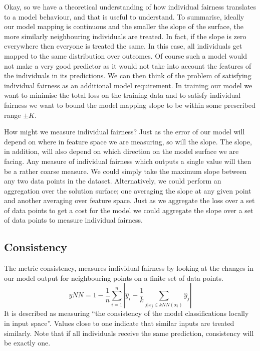 Okay, so we have a theoretical understanding of how individual fairness translates to a model behaviour, and that is useful to understand. To summarise, ideally our model mapping is continuous and the smaller the slope of the surface, the more similarly neighbouring individuals are treated. In fact, if the slope is zero everywhere then everyone is treated the same. In this case, all individuals get mapped to the same distribution over outcomes. Of course such a model would not make a very good predictor as it would not take into account the features of the individuals in its predictions. We can then think of the problem of satisfying individual fairness as an additional model requirement. In training our model we want to minimise the total loss on the training data and to satisfy individual fairness we want to bound the model mapping slope to be within some prescribed range $\pm K$.

How might we measure individual fairness? Just as the error of our model will depend on where in feature space we are measuring, so will the slope. The slope, in addition, will also depend on which direction on the model surface we are facing. Any measure of individual fairness which outputs a single value will then be a rather coarse measure. We could simply take the maximum slope between any two data points in the dataset. Alternatively, we could perform an aggregation over the solution surface; one averaging the slope at any given point and another averaging over feature space. Just as we aggregate the loss over a set of data points to get a cost for the model we could aggregate the slope over a set of data points to measure individual fairness.

\subsection{Consistency}

The metric consistency, measures individual fairness by looking at the changes in our model output for neighbouring points on a finite set of data points.
\[
yNN = 1 - \frac{1}{n} \sum_{i=1}^n \left| \hat{y}_i -
\frac{1}{k}\sum_{j|x_j\in kNN(\boldsymbol{x}_i)} \hat{y}_j \right|
\]
It is described as measuring ``the consistency of the model classifications locally in input space''\cite{ZemelLearnFairReps}. Values close to one indicate that similar inputs are treated similarly. Note that if all individuals receive the same prediction, consistency will be exactly one.

